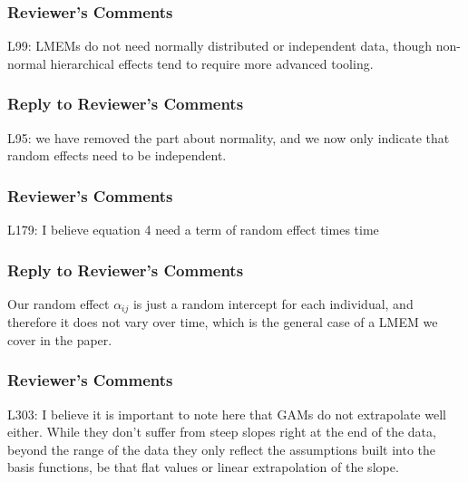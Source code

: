 \documentclass[
]{article}
\begin{document}
\hypertarget{reviewers-comments-38}{%
\subsubsection{Reviewer's Comments}\label{reviewers-comments-38}}

L99: LMEMs do not need normally distributed or independent data, though non-normal hierarchical effects tend to require more advanced tooling.

\hypertarget{section-42}{%
\subsubsection{\texorpdfstring{\textcolor{reviewersblue} {Reply to Reviewer's Comments}}{}}\label{section-42}}

L95: we have removed the part about normality, and we now only indicate that random effects need to be independent.

\hypertarget{reviewers-comments-39}{%
\subsubsection{Reviewer's Comments}\label{reviewers-comments-39}}

L179: I believe equation 4 need a term of random effect times time

\hypertarget{section-43}{%
\subsubsection{\texorpdfstring{\textcolor{reviewersblue} {Reply to Reviewer's Comments}}{}}\label{section-43}}

Our random effect \(\alpha_{ij}\) is just a random intercept for each individual, and therefore it does not vary over time, which is the general case of a LMEM we cover in the paper.

\hypertarget{reviewers-comments-40}{%
\subsubsection{Reviewer's Comments}\label{reviewers-comments-40}}

L303: I believe it is important to note here that GAMs do not extrapolate well either. While they don't suffer from steep slopes right at the end of the data, beyond the range of the data they only reflect the assumptions built into the basis functions, be that flat values or linear extrapolation of the slope.
\end{document}
